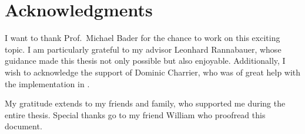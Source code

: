 \thispagestyle{empty}




\chapter{Acknowledgments}
\vspace{1em}
I want to thank Prof.\ Michael Bader for the chance to work on this exciting topic.
I am particularly grateful to my advisor Leonhard Rannabauer, whose guidance made this thesis not only possible but also enjoyable.
Additionally, I wish to acknowledge the support of Dominic Charrier, who was of great help with the implementation in \exahype{}.

My gratitude extends to my friends and family, who supported me during the entire thesis.
Special thanks go to my friend William who proofread this document.
\cleardoublepage{}


